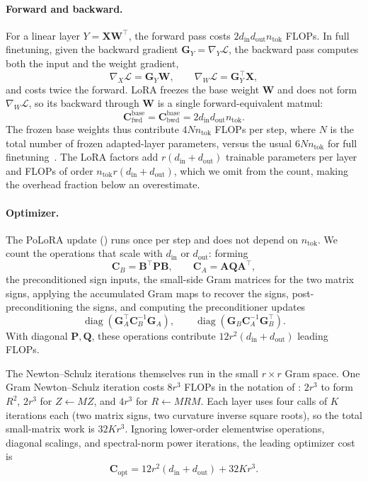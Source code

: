 \documentclass{article}
\newcommand{\mat}[1]{\bm{#1}}
\DeclareMathOperator{\diag}{diag}
\newcommand{\methodname}{PoLoRA\xspace}
\begin{document}
\paragraph{Forward and backward.}
For a linear
layer $Y=\mat{X}\mat{W}^\top$, the forward pass costs
$2d_{\mathrm{in}}d_{\mathrm{out}}n_{\mathrm{tok}}$
FLOPs.
In full finetuning, given the backward gradient $\mat{G}_Y=\nabla_Y \mathcal{L}$,
the backward pass computes both the input and the weight gradient,
\[
\nabla_X \mathcal{L} = \mat{G}_Y \mat{W},
\qquad
\nabla_W \mathcal{L} = \mat{G}_Y^\top \mat{X},
\]
and costs twice the forward. LoRA freezes the base weight $\mat{W}$ and does not form
$\nabla_W \mathcal{L}$, so its backward through $\mat{W}$ is a single forward-equivalent matmul:
\begin{equation}
  \mat{C}_{\mathrm{fwd}}^{\mathrm{base}}
  =
  \mat{C}_{\mathrm{bwd}}^{\mathrm{base}}
  =
  2 d_{\mathrm{in}}d_{\mathrm{out}} n_{\mathrm{tok}} .
  \label{eq:flop-fb}
\end{equation}
The frozen base weights thus contribute $4Nn_{\mathrm{tok}}$ FLOPs per step, where $N$ is the total number of frozen adapted-layer parameters, versus the usual $6Nn_{\mathrm{tok}}$ for full finetuning~\cite{kaplan2020scaling}. The LoRA factors add $r(d_{\mathrm{in}}+d_{\mathrm{out}})$ trainable parameters per layer and FLOPs of order $n_{\mathrm{tok}}r(d_{\mathrm{in}}+d_{\mathrm{out}})$, which we omit from the count, making the overhead fraction below an overestimate.

\paragraph{Optimizer.}
The \methodname{} update () runs once per step and does not
depend on $n_{\mathrm{tok}}$.
We count the operations that scale with
$d_{\mathrm{in}}$ or $d_{\mathrm{out}}$: forming
\[
    \mat{C}_B=\mat{B}^\top \mat{P} \mat{B},
    \qquad
    \mat{C}_A=\mat{A} \mat{Q} \mat{A}^\top,
\]
the preconditioned sign inputs, 
the small-side Gram matrices for the two
matrix signs, applying the accumulated Gram maps to recover the signs,
post-preconditioning the signs, and computing the preconditioner updates
\[
    \diag(\mat{G}_A^\top \mat{C}_B^{-1}\mat{G}_A),
    \qquad
    \diag(\mat{G}_B \mat{C}_A^{-1}\mat{G}_B^\top).
\]
With diagonal $\mat{P}, \mat{Q}$, these operations contribute
$12r^2(d_{\mathrm{in}}+d_{\mathrm{out}})$
leading FLOPs.

The Newton--Schulz iterations themselves run in the small $r\times r$ Gram
space.  One Gram Newton--Schulz iteration costs $8r^3$ FLOPs in the notation of
: $2r^3$ to form $R^2$, $2r^3$ for $Z\leftarrow MZ$, and $4r^3$ for
$R\leftarrow MRM$.  Each layer uses four calls of $K$ iterations each (two matrix
signs, two curvature inverse square roots), so the total small-matrix work is $32Kr^3$.
Ignoring lower-order elementwise operations, diagonal scalings, and spectral-norm
power iterations, the leading optimizer cost is
\begin{equation}
  \mat{C}_{\mathrm{opt}}
  =
  12r^2(d_{\mathrm{in}}+d_{\mathrm{out}})
  +
  32Kr^3 .
  \label{eq:flop-opt}
\end{equation}
\end{document}
